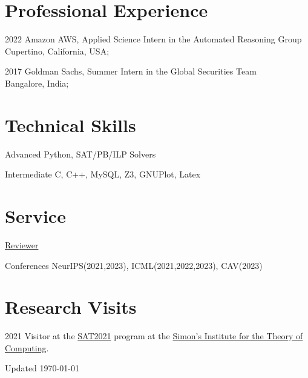 \documentclass[12pt,letterpaper]{report}
\begin{document}
    \section*{Professional Experience}
    \begin{tablist}
        \item[2022] \tab Amazon AWS, Applied Science Intern in the Automated Reasoning Group\\
        Cupertino, California, USA;
    \end{tablist}
    \begin{tablist}
        \item[2017] \tab Goldman Sachs, Summer Intern in the Global Securities Team\\
        Bangalore, India;
    \end{tablist}

	\section*{Technical Skills}
	\begin{tablist}
		\item[Advanced] \tab Python, SAT/PB/ILP Solvers
		\item[Intermediate] \tab C, C++, MySQL, Z3, GNUPlot, Latex
	\end{tablist}
	
	
	\section*{Service}
	\underline{Reviewer }
	\begin{tablist}
		\item[Conferences] \tab NeurIPS(2021,2023), ICML(2021,2022,2023), CAV(2023)
	\end{tablist}
	
	\section*{Research Visits}
		\begin{tablist}
	\item[2021]
 Visitor at the \href{https://simons.berkeley.edu/programs/sat2021}{SAT2021} program at the \href{https://simons.berkeley.edu/}{Simon's Institute for the Theory of Computing}.
	\end{tablist}
	
    \begin{center}
        \vfill
        Updated \monthyeardate\today
    \end{center}
\end{document}
